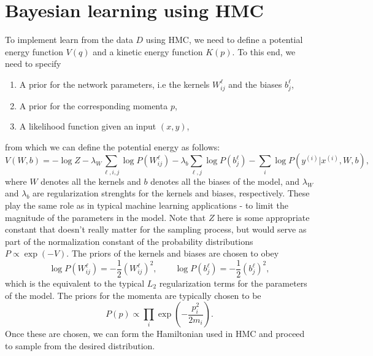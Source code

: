 \section{Bayesian learning using HMC}
To implement learn from the data $D$ using HMC, we need to define a potential energy function $V(q)$ 
and a kinetic energy function $K(p)$. To this end, we need to specify
\begin{enumerate}
  \item A prior for the network parameters, i.e the kernels $W_{ij}^\ell$ and the biases $b_j^{\ell}$,
  \item A prior for the corresponding momenta $p$,
  \item A likelihood function given an input $(x, y)$,
\end{enumerate}
from which we can define the potential energy as follows:
\begin{equation}
  V(W, b) = - \log Z - \lambda_W\sum_{\ell,i,j}\log P(W_{ij}^\ell) - \lambda_b\sum_{\ell,j}\log P(b_j^\ell) - \sum_i \log P(y^{(i)}| x^{(i)}, W, b), 
\end{equation}
where $W$ denotes all the kernels and $b$ denotes all the biases of the model, 
and $\lambda_W$ and $\lambda_b$ are regularization strenghts for the kernels and biases, respectively. 
These play the same role as in typical machine learning applications - to limit the magnitude of the parameters in the model.
Note that $Z$ here is some appropriate constant that doesn't really matter for the sampling process, 
but would serve as part of the normalization constant of the probability distributions $P \propto \exp(-V)$.
The priors of the kernels and biases are chosen to obey
\begin{equation}
  \log P(W_{ij}^\ell) = -\frac{1}{2}(W_{ij}^\ell)^2, \qquad \log P(b_j^\ell) = -\frac{1}{2}(b_j^\ell)^2,
\end{equation}
which is the equivalent to the typical $L_2$ regularization terms for the parameters of the model.
The priors for the momenta are typically chosen to be 
\begin{equation}
  P(p) \propto \prod_i \exp \left(- \frac{p_i^2}{2m_i}\right).
\end{equation}
Once these are chosen, we can form the Hamiltonian used in HMC and proceed to sample from the desired distribution.
